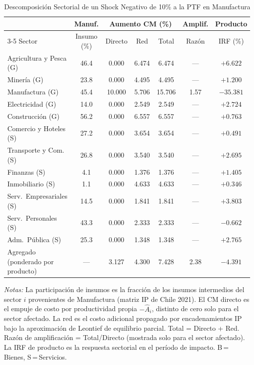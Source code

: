 \begin{table}[htbp]
\centering
\caption{Descomposición Sectorial de un Shock Negativo de 10\% a la PTF en Manufactura}
\label{tab:mfg_decomp}
\begin{threeparttable}
\small
\begin{tabular}{@{}l c c c c c c@{}}
\toprule
 & Manuf. & \multicolumn{3}{c}{Aumento CM (\%)} & Amplif. & Producto \\
\cmidrule(lr){3-5}
Sector & Insumo (\%) & Directo & Red & Total & Razón & IRF (\%) \\
\midrule
Agricultura y Pesca (G) & 46.4 & 0.000 & 6.474 & 6.474 & --- & $+6.622$ \\
Minería (G) & 23.8 & 0.000 & 4.495 & 4.495 & --- & $+1.200$ \\
Manufactura (G) & 45.4 & 10.000 & 5.706 & 15.706 &  1.57 & $-35.381$ \\
Electricidad (G) & 14.0 & 0.000 & 2.549 & 2.549 & --- & $+2.724$ \\
Construcción (G) & 56.2 & 0.000 & 6.557 & 6.557 & --- & $+0.763$ \\
Comercio y Hoteles (S) & 27.2 & 0.000 & 3.654 & 3.654 & --- & $+0.491$ \\
Transporte y Com. (S) & 26.8 & 0.000 & 3.540 & 3.540 & --- & $+2.695$ \\
Finanzas (S) &  4.1 & 0.000 & 1.376 & 1.376 & --- & $+1.405$ \\
Inmobiliario (S) &  1.1 & 0.000 & 4.633 & 4.633 & --- & $+0.346$ \\
Serv.\ Empresariales (S) & 14.5 & 0.000 & 1.841 & 1.841 & --- & $+3.803$ \\
Serv.\ Personales (S) & 43.3 & 0.000 & 2.333 & 2.333 & --- & $-0.662$ \\
Adm.\ Pública (S) & 25.3 & 0.000 & 1.348 & 1.348 & --- & $+2.765$ \\
\midrule
Agregado (ponderado por producto) & --- & 3.127 & 4.300 & 7.428 &  2.38 & $-4.391$ \\
\bottomrule
\end{tabular}
\begin{tablenotes}[flushleft]
\footnotesize
\item \textit{Notas:} La participación de insumos es la fracción de los insumos intermedios del sector $i$ provenientes de Manufactura (matriz IP de Chile 2021). El CM directo es el empuje de costo por productividad propia $-\hat A_i$, distinto de cero solo para el sector afectado. La red es el costo adicional propagado por encadenamientos IP bajo la aproximación de Leontief de equilibrio parcial. Total = Directo + Red. Razón de amplificación = Total/Directo (mostrada solo para el sector afectado). La IRF de producto es la respuesta sectorial en el período de impacto. B\,=\,Bienes, S\,=\,Servicios.
\end{tablenotes}
\end{threeparttable}
\end{table}
